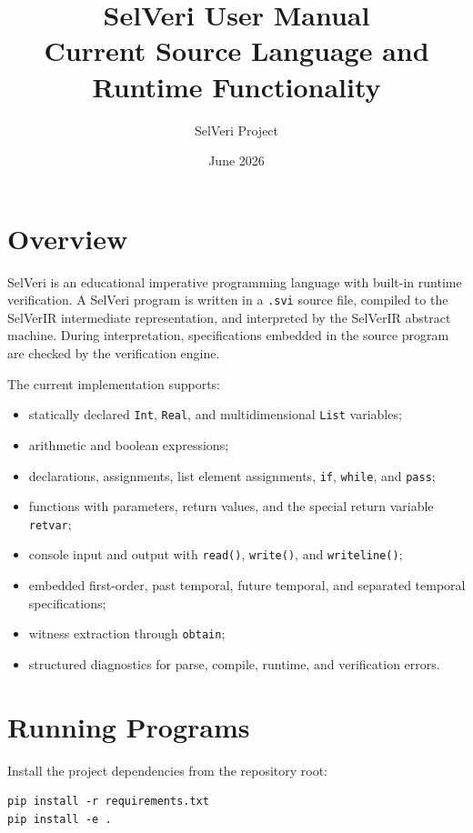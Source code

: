 \documentclass[11pt]{article}
\title{SelVeri User Manual\\\large Current Source Language and Runtime Functionality}
\author{SelVeri Project}
\date{June 2026}
\begin{document}
\maketitle
\tableofcontents
\newpage

\section{Overview}

SelVeri is an educational imperative programming language with built-in runtime verification. A SelVeri program is written in a \texttt{.svi} source file, compiled to the SelVerIR intermediate representation, and interpreted by the SelVerIR abstract machine. During interpretation, specifications embedded in the source program are checked by the verification engine.

The current implementation supports:

\begin{itemize}[nosep]
  \item statically declared \texttt{Int}, \texttt{Real}, and multidimensional \texttt{List} variables;
  \item arithmetic and boolean expressions;
  \item declarations, assignments, list element assignments, \texttt{if}, \texttt{while}, and \texttt{pass};
  \item functions with parameters, return values, and the special return variable \texttt{retvar};
  \item console input and output with \texttt{read()}, \texttt{write()}, and \texttt{writeline()};
  \item embedded first-order, past temporal, future temporal, and separated temporal specifications;
  \item witness extraction through \texttt{obtain};
  \item structured diagnostics for parse, compile, runtime, and verification errors.
\end{itemize}

\section{Running Programs}

Install the project dependencies from the repository root:

\begin{lstlisting}
pip install -r requirements.txt
pip install -e .
\end{lstlisting}
\end{document}
